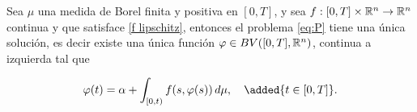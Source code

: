  
\begin{thm}\label{th:picar}
    Sea $\mu$ una medida de Borel finita y positiva en $[0,T]$, y sea $f:[0,T]\times\mathbb{R}^n\to\mathbb{R}^n$ continua y que satisface \ref{f lipschitz},\reversemarginpar{} entonces el problema \eqref{eq:P} tiene una única solución, es decir existe una única función $\varphi\in BV([0,T],\mathbb{R}^n)$, continua a izquierda tal que 
 
    \begin{equation*}
        \varphi(t)=\alpha + \int_{[0,t)}f(s,\varphi(s))\, d\mu,\quad\added{t\in [0,T]}. 
    \end{equation*}
\end{thm}
